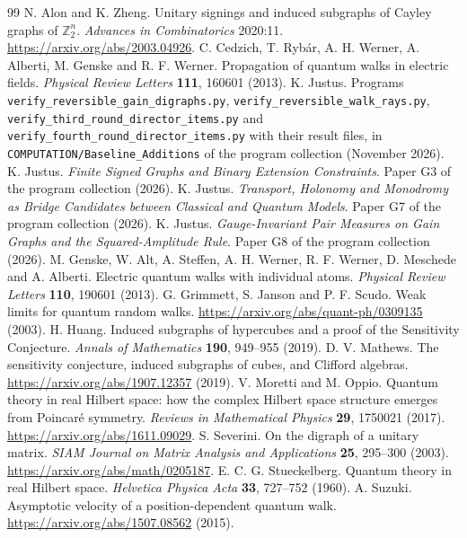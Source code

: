 \documentclass[11pt,a4paper]{article}
\begin{document}
\begin{thebibliography}{99}
 N. Alon and K. Zheng. Unitary signings and induced subgraphs of Cayley graphs of $\mathbb{Z}_2^n$. \emph{Advances in Combinatorics} 2020:11. \url{https://arxiv.org/abs/2003.04926}.
 C. Cedzich, T. Ryb\'ar, A. H. Werner, A. Alberti, M. Genske and R. F. Werner. Propagation of quantum walks in electric fields. \emph{Physical Review Letters} \textbf{111}, 160601 (2013).
 K. Justus. Programs \texttt{verify\_reversible\_gain\_digraphs.py}, \texttt{verify\_reversible\_walk\_rays.py}, \texttt{verify\_third\_round\_director\_items.py} and \texttt{verify\_fourth\_round\_director\_items.py} with their result files, in \texttt{COMPUTATION/Baseline\_Additions} of the program collection (November 2026).
 K. Justus. \emph{Finite Signed Graphs and Binary Extension Constraints}. Paper G3 of the program collection (2026).
 K. Justus. \emph{Transport, Holonomy and Monodromy as Bridge Candidates between Classical and Quantum Models}. Paper G7 of the program collection (2026).
 K. Justus. \emph{Gauge-Invariant Pair Measures on Gain Graphs and the Squared-Amplitude Rule}. Paper G8 of the program collection (2026).
 M. Genske, W. Alt, A. Steffen, A. H. Werner, R. F. Werner, D. Meschede and A. Alberti. Electric quantum walks with individual atoms. \emph{Physical Review Letters} \textbf{110}, 190601 (2013).
 G. Grimmett, S. Janson and P. F. Scudo. Weak limits for quantum random walks. \url{https://arxiv.org/abs/quant-ph/0309135} (2003).
 H. Huang. Induced subgraphs of hypercubes and a proof of the Sensitivity Conjecture. \emph{Annals of Mathematics} \textbf{190}, 949--955 (2019).
 D. V. Mathews. The sensitivity conjecture, induced subgraphs of cubes, and Clifford algebras. \url{https://arxiv.org/abs/1907.12357} (2019).
 V. Moretti and M. Oppio. Quantum theory in real Hilbert space: how the complex Hilbert space structure emerges from Poincar\'e symmetry. \emph{Reviews in Mathematical Physics} \textbf{29}, 1750021 (2017). \url{https://arxiv.org/abs/1611.09029}.
 S. Severini. On the digraph of a unitary matrix. \emph{SIAM Journal on Matrix Analysis and Applications} \textbf{25}, 295--300 (2003). \url{https://arxiv.org/abs/math/0205187}.
 E. C. G. Stueckelberg. Quantum theory in real Hilbert space. \emph{Helvetica Physica Acta} \textbf{33}, 727--752 (1960).
 A. Suzuki. Asymptotic velocity of a position-dependent quantum walk. \url{https://arxiv.org/abs/1507.08562} (2015).
\end{thebibliography}
\end{document}
